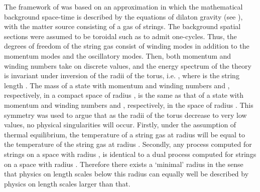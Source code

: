 \documentclass[a4paper,twocolumn,nofootinbib,tightenlines,prd,aps,
               superscriptaddress]{revtex4} %
\providecommand{\al}{\alpha}
\begin{document}
The framework of \cite{Brandenberger:1989aj} was based on an
approximation in which the mathematical background space-time is
described by the equations of dilaton gravity (see
\cite{Tseytlin:1992xk,Veneziano:1991ek}), with the matter source
consisting of a gas of strings. The background spatial sections
were assumed to be toroidal such as to admit one-cycles. Thus, the
degrees of freedom of the string gas consist of winding modes in
addition to the momentum modes and the oscillatory modes. Then,
both momentum and winding numbers take on discrete values, and the
energy spectrum of the theory is invariant under inversion of the
radii of the torus, i.e. \myHighlight{$R \rightarrow \al'/R$}\coordHE{}, where \myHighlight{$\al^{'
1/2}$}\coordHE{} is the string length \coordHE{}. The mass of a state with
momentum and winding numbers \coordHE{} and \myHighlight{$\omega$}\coordHE{}, respectively, in a
compact space of radius \coordHE{}, is the same as that of a state with
momentum and winding numbers \myHighlight{$\omega$}\coordHE{} and \coordHE{}, respectively, in
the space of radius \myHighlight{$\al'/ R$}\coordHE{}. This symmetry was used to argue
\cite{Brandenberger:1989aj} that as the radii of the torus
decrease to very low values, no physical singularities will occur.
Firstly, under the assumption of thermal equilibrium, the
temperature of a string gas at radius \coordHE{} will be equal to the
temperature of the string gas at radius \myHighlight{$\al'/ R$}\coordHE{}. Secondly, any
process computed for strings on a space with radius \coordHE{}, is
identical to a dual process computed for strings on a  space with
radius \myHighlight{$\al'/ R$}\coordHE{}. Therefore there exists a `minimal' radius
\myHighlight{$\al^{' 1/2}$}\coordHE{} in the sense that physics on length scales below
this radius can equally well be described by physics on length
scales larger than that.
\end{document}
